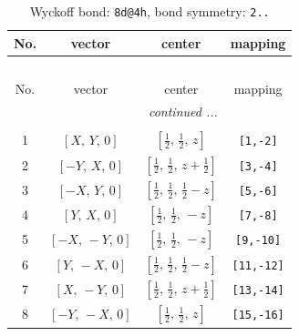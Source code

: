 \documentclass[fleqn,8pt]{jsarticle}
\begin{document}
\begin{longtable}{cccc}
\caption{Wyckoff bond: {\tt 8d@4h}, bond symmetry: {\tt 2..}}
 \\
 \hline \hline
No. & vector & center & mapping \\ \hline \endfirsthead

\multicolumn{3}{l}{\tablename\ \thetable{}} \\
 \hline \hline
No. & vector & center & mapping \\ \hline \endhead

 \hline \hline
\multicolumn{3}{r}{\footnotesize\it continued ...} \\ \endfoot

 \hline \hline
\multicolumn{3}{r}{} \\ \endlastfoot

1 & $\left[ X,\, Y,\, 0 \right]$ & $\left[ \frac{1}{2},\, \frac{1}{2},\, z \right]$ & {\tt [1,-2]} \\ \hline
2 & $\left[ - Y,\, X,\, 0 \right]$ & $\left[ \frac{1}{2},\, \frac{1}{2},\, z + \frac{1}{2} \right]$ & {\tt [3,-4]} \\ \hline
3 & $\left[ - X,\, Y,\, 0 \right]$ & $\left[ \frac{1}{2},\, \frac{1}{2},\, \frac{1}{2} - z \right]$ & {\tt [5,-6]} \\ \hline
4 & $\left[ Y,\, X,\, 0 \right]$ & $\left[ \frac{1}{2},\, \frac{1}{2},\, - z \right]$ & {\tt [7,-8]} \\ \hline
5 & $\left[ - X,\, - Y,\, 0 \right]$ & $\left[ \frac{1}{2},\, \frac{1}{2},\, - z \right]$ & {\tt [9,-10]} \\ \hline
6 & $\left[ Y,\, - X,\, 0 \right]$ & $\left[ \frac{1}{2},\, \frac{1}{2},\, \frac{1}{2} - z \right]$ & {\tt [11,-12]} \\ \hline
7 & $\left[ X,\, - Y,\, 0 \right]$ & $\left[ \frac{1}{2},\, \frac{1}{2},\, z + \frac{1}{2} \right]$ & {\tt [13,-14]} \\ \hline
8 & $\left[ - Y,\, - X,\, 0 \right]$ & $\left[ \frac{1}{2},\, \frac{1}{2},\, z \right]$ & {\tt [15,-16]} \\
\end{longtable}
\renewcommand{\arraystretch}{1.2}
\end{document}
